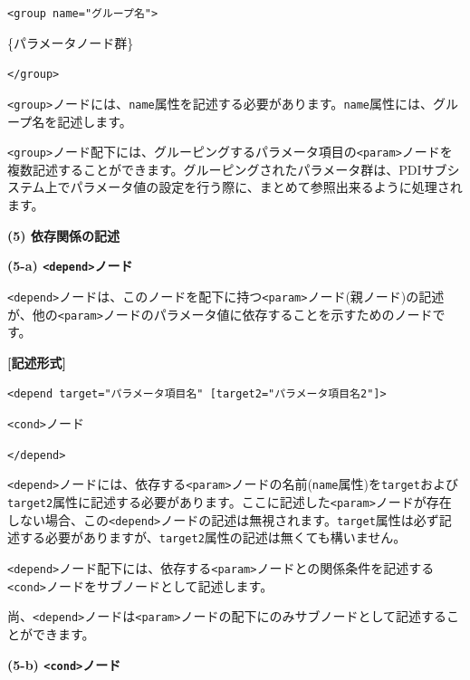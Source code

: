 \documentclass[a4paper,11pt]{jarticle}
\begin{document}
{\leftskip=42pt
\texttt{<group name="グループ名">}    

\parindent=14pt
\{パラメータノード群\}

\parindent=0pt
\texttt{</group>}

\vspace{8pt}
\leftskip=0pt
\texttt{<group>}ノードには、{\tt name}属性を記述する必要があります。{\tt name}属性には、グループ名を記述します。

\vspace{12pt}
\texttt{<group>}ノード配下には、グルーピングするパラメータ項目の\texttt{<param>}ノードを複数記述することができます。グルーピングされたパラメータ群は、PDIサブシステム上でパラメータ値の設定を行う際に、まとめて参照出来るように処理されます。

\vspace{12pt}
\textbf{(5) 依存関係の記述}

\vspace{12pt}
\textbf{(5-a) \texttt{<depend>}ノード}

\texttt{<depend>}ノードは、このノードを配下に持つ\texttt{<param>}ノード(親ノード)の記述が、他の\texttt{<param>}ノードのパラメータ値に依存することを示すためのノードです。

\vspace{8pt}
\leftskip=12pt
\textbf{[記述形式]}

\leftskip=42pt
\texttt{<depend target="パラメータ項目名" [target2="パラメータ項目名2"]>} 
   

\parindent=14pt
\texttt{<cond>}ノード

\parindent=0pt
\texttt{</depend>}

\vspace{8pt}
\leftskip=0pt
\texttt{<depend>}ノードには、依存する\texttt{<param>}ノードの名前({\tt name}属性)を\texttt{target}および\texttt{target2}属性に記述する必要があります。ここに記述した\texttt{<param>}ノードが存在しない場合、この\texttt{<depend>}ノードの記述は無視されます。\texttt{target}属性は必ず記述する必要がありますが、\texttt{target2}属性の記述は無くても構いません。

\texttt{<depend>}ノード配下には、依存する\texttt{<param>}ノードとの関係条件を記述する\texttt{<cond>}ノードをサブノードとして記述します。

\vspace{12pt}
尚、\texttt{<depend>}ノードは\texttt{<param>}ノードの配下にのみサブノードとして記述することができます。

\vspace{12pt}
\textbf{(5-b) \texttt{<cond>}ノード}

}
\end{document}
